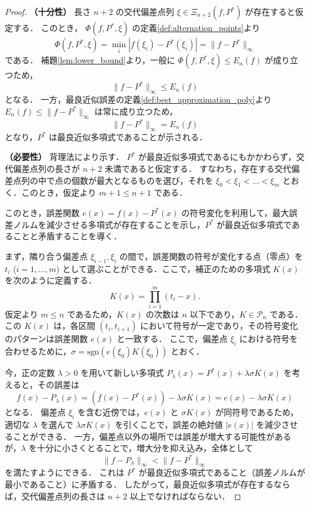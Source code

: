     \begin{proof}
      \textbf{（十分性）}
      長さ $n+2$ の交代偏差点列 $\xi \in \Xi_{n+2}(f, P^*)$ が存在すると仮定する．
      このとき， $\Phi(f, P^*, \xi)$ の定義\ref{def:alternation_points}より
      \[ \Phi(f, P^*, \xi) = \min_{i} |f(\xi_i) - P^*(\xi_i)| = \|f - P^*\|_\infty \]
      である． 補題\ref{lem:lower_bound}より，一般に $\Phi(f, P^*, \xi) \le E_n(f)$ が成り立つため，
      \begin{equation}
        \|f - P^*\|_\infty \le E_n(f)
      \end{equation}
      となる． 一方，最良近似誤差の定義\ref{def:best_approximation_poly}より $E_n(f) \le \|f - P^*\|_\infty$ は常に成り立つため，
      \[ \|f - P^*\|_\infty = E_n(f) \]
      となり，$P^*$ は最良近似多項式であることが示される．

      \textbf{（必要性）}
      背理法により示す． $P^*$ が最良近似多項式であるにもかかわらず，交代偏差点列の長さが $n+2$ 未満であると仮定する．
      すなわち，存在する交代偏差点列の中で点の個数が最大となるものを選び，それを $\xi_0 < \xi_1 < \dots < \xi_m$ とおく．このとき，仮定より $m+1 \le n+1$ である．
      
      このとき，誤差関数 $e(x) = f(x) - P^*(x)$ の符号変化を利用して，最大誤差ノルムを減少させる多項式が存在することを示し，$P^*$ が最良近似多項式であることと矛盾することを導く．

      まず，隣り合う偏差点 $\xi_{i-1}, \xi_i$ の間で，誤差関数の符号が変化する点（零点）を $t_i$ ($i=1, \dots, m$) として選ぶことができる．ここで，補正のための多項式 $K(x)$ を次のように定義する．
      \begin{equation}
        K(x) = \prod_{i=1}^m (t_i - x).
        \label{eq:correction_poly}
      \end{equation}
      仮定より $m \le n$ であるため，$K(x)$ の次数は $n$ 以下であり，$K \in \mathcal{P}_n$ である．
      この $K(x)$ は，各区間 $(t_i, t_{i+1})$ において符号が一定であり，その符号変化のパターンは誤差関数 $e(x)$ と一致する．
      ここで，偏差点 $\xi_i$ における符号を合わせるために，$\sigma = \text{sgn}(e(\xi_0) K(\xi_0))$ とおく．

      今，正の定数 $\lambda > 0$ を用いて新しい多項式 $P_\lambda(x) = P^*(x) + \lambda \sigma K(x)$ を考えると，その誤差は
      \[ f(x) - P_\lambda(x) = (f(x) - P^*(x)) - \lambda \sigma K(x) = e(x) - \lambda \sigma K(x) \]
      となる．
      偏差点 $\xi_i$ を含む近傍では，$e(x)$ と $\sigma K(x)$ が同符号であるため，適切な $\lambda$ を選んで $\lambda \sigma K(x)$ を引くことで，誤差の絶対値 $|e(x)|$ を減少させることができる．      
      一方，偏差点以外の場所では誤差が増大する可能性があるが，$\lambda$ を十分に小さくとることで，増大分を抑え込み，全体として
      \begin{equation}
        \| f - P_\lambda \|_\infty < \| f - P^* \|_\infty
      \end{equation}
      を満たすようにできる．
      これは $P^*$ が最良近似多項式であること（誤差ノルムが最小であること）に矛盾する．
      したがって，最良近似多項式が存在するならば，交代偏差点列の長さは $n+2$ 以上でなければならない．
    \end{proof}
  \label{subsec:uniqueness}
    
